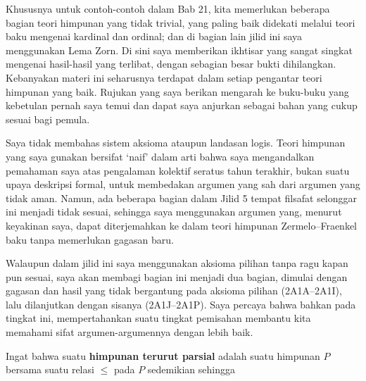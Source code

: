 
\def\chaptername{Lampiran}
\def\sectionname{Teori himpunan}

\def\Enderton{{\smc Enderton 77}}
\def\Halmos{{\smc Halmos 60}}
\def\Henle{{\smc Henle 86}}
\def\Krivine{{\smc Krivine 71}}
\def\Lipschutz{{\smc Lipschutz 64}}
\def\Roitman{{\smc Roitman 90}}


Khususnya untuk contoh-contoh dalam Bab 21, kita memerlukan beberapa bagian
teori himpunan yang tidak trivial, yang paling baik didekati melalui teori
baku mengenai kardinal dan ordinal; dan di bagian lain jilid ini saya
menggunakan Lema Zorn.
Di sini saya memberikan ikhtisar yang sangat singkat mengenai hasil-hasil
yang terlibat, dengan sebagian besar bukti dihilangkan.
Kebanyakan materi ini seharusnya terdapat dalam setiap pengantar teori
himpunan yang baik.
Rujukan yang saya berikan mengarah ke buku-buku yang kebetulan pernah saya
temui dan dapat saya anjurkan sebagai bahan yang cukup sesuai bagi pemula.

Saya tidak membahas sistem aksioma ataupun landasan logis. Teori himpunan
yang saya gunakan bersifat `naif' dalam arti bahwa saya mengandalkan
pemahaman saya atas pengalaman kolektif seratus tahun terakhir, bukan
suatu upaya deskripsi formal, untuk membedakan argumen yang sah dari argumen
yang tidak aman. Namun, ada beberapa bagian dalam Jilid 5 tempat filsafat
selonggar ini menjadi tidak sesuai, sehingga saya menggunakan argumen yang,
menurut keyakinan saya, dapat diterjemahkan ke dalam teori himpunan
Zermelo--Fraenkel baku tanpa memerlukan gagasan baru.

Walaupun dalam jilid ini saya menggunakan aksioma pilihan tanpa ragu kapan
pun sesuai, saya akan membagi bagian ini menjadi dua bagian, dimulai dengan
gagasan dan hasil yang tidak bergantung pada aksioma pilihan (2A1A--2A1I),
lalu dilanjutkan dengan sisanya (2A1J--2A1P). Saya percaya bahwa bahkan pada
tingkat ini, mempertahankan suatu tingkat pemisahan membantu kita memahami
sifat argumen-argumennya dengan lebih baik.

 Ingat bahwa suatu {\bf himpunan terurut
parsial} adalah suatu himpunan $P$ bersama suatu relasi $\le$ pada $P$
sedemikian sehingga


